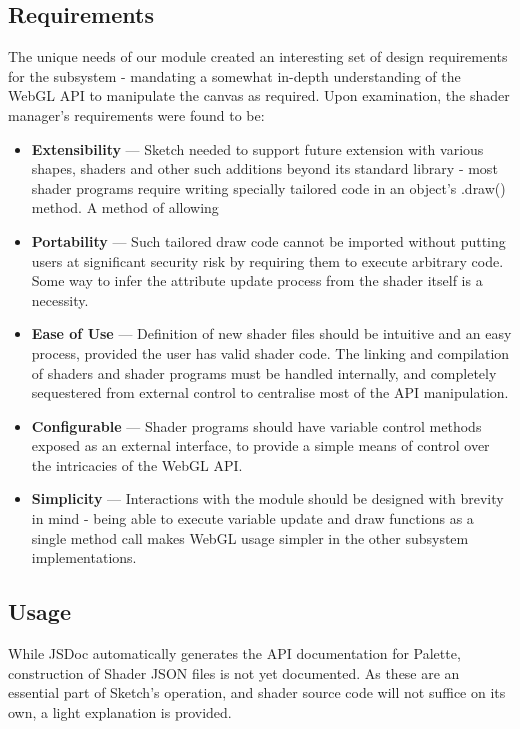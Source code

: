 \documentclass{l3proj}
\begin{document}
\subsection{Requirements}
\label{arch-shad-req}
The unique needs of our module created an interesting set of design requirements for the subsystem - mandating a somewhat in-depth understanding of the WebGL API to manipulate the canvas as required. Upon examination, the shader manager's requirements were found to be:
\begin{itemize}
\item \textbf{Extensibility} --- Sketch needed to support future extension with various shapes, shaders and other such additions beyond its standard library - most shader programs require writing specially tailored code in an object's .draw() method. A method of allowing
\item \textbf{Portability} --- Such tailored draw code cannot be imported without putting users at significant security risk by requiring them to execute arbitrary code. Some way to infer the attribute update process from the shader itself is a necessity.
\item \textbf{Ease of Use} --- Definition of new shader files should be intuitive and an easy process, provided the user has valid shader code. The linking and compilation of shaders and shader programs must be handled internally, and completely sequestered from external control to centralise most of the API manipulation.
\item \textbf{Configurable} --- Shader programs should have variable control methods exposed as an external interface, to provide a simple means of control over the intricacies of the WebGL API.
\item \textbf{Simplicity} --- Interactions with the module should be designed with brevity in mind - being able to execute variable update and draw functions as a single method call makes WebGL usage simpler in the other subsystem implementations.
\end{itemize}

\subsection{Usage}
\label{arch-shad-use}

While JSDoc automatically generates the API documentation for Palette, construction of Shader JSON files is not yet documented. As these are an essential part of Sketch's operation, and shader source code will not suffice on its own, a light explanation is provided.
\end{document}

